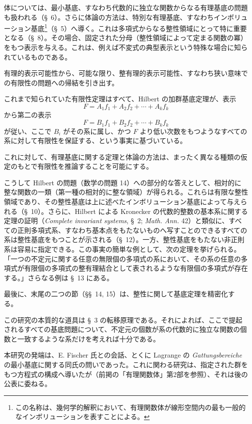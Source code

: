 \documentclass[11pt]{article}
\begin{document}
体については、最小基底、すなわち代数的に独立な関数からなる有理基底の問題も扱われる（\S\ 6）。さらに体論の方法は、特別な有理基底、すなわちインボリューション基底\footnote{この名称は、幾何学的解釈において、有理関数体が線形空間内の最も一般的なインボリューションを表すことによる。}（\S\ 5）へ導く。これは多項式からなる整性領域にとって特に重要となる（\S\ 8）。その場合、固定された分母（整性領域によって定まる関数の冪）をもつ表示を与える。これは、例えば不変式の典型表示という特殊な場合に知られているものである。

有理的表示可能性から、可能な限り、整有理的表示可能性、すなわち狭い意味での有限性の問題への帰結を引き出す。

これまで知られていた有限性定理はすべて、Hilbert の加群基底定理が、表示
\[
  F=A_1f_1+A_2f_2+\cdots+A_kf_k
\]
から第二の表示
\[
  F=B_1f_1+B_2f_2+\cdots+B_kf_k
\]
が従い、ここで $B_i$ がその系に属し、かつ $F$ より低い次数をもつようなすべての系に対して有限性を保証する、という事実に基づいている。

これに対して、有理基底に関する定理と体論の方法は、まったく異なる種類の仮定のもとで有限性を推論することを可能にする。

こうして Hilbert の問題（数学の問題 14）への部分的な答えとして、相対的に整な関数の一類（第一種の相対的に整な領域）が得られる。これらは有限な整性領域であり、その整性基底は上に述べたインボリューション基底によって与えられる（\S\ 10）。さらに、Hilbert による Kronecker の代数的整数の基本系に関する定理の証明（\emph{Complete invariant systems}, \S\ 2; \emph{Math. Ann.} 42）と類似に、すべての正則多項式系、すなわち基本点をもたないものへ写すことのできるすべての系は整性基底をもつことが示される（\S\ 12）。一方、整性基底をもたない非正則系は容易に指定できる。この事実の簡単な例として、次の定理を挙げられる。「一つの不定元に関する任意の無限個の多項式の系において、その系の任意の多項式が有限個の多項式の整有理結合として表されるような有限個の多項式が存在する。」さらなる例は \S\ 13 にある。

最後に、末尾の二つの節（\S\S\ 14, 15）は、整性に関して基底定理を精密化する。

この研究の本質的な道具は \S\ 3 の転移原理である。それによれば、ここで提起されるすべての基底問題について、不定元の個数が系の代数的に独立な関数の個数と一致するような系だけを考えれば十分である。

本研究の発端は、E. Fischer 氏との会話、とくに Lagrange の \emph{Gattungsbereiche} の最小基底に関する同氏の問いであった。これに関わる研究は、指定された群をもつ方程式の構成へ導いたが（前掲の「有理関数体」第2部を参照）、それは後の公表に委ねる。
\end{document}
